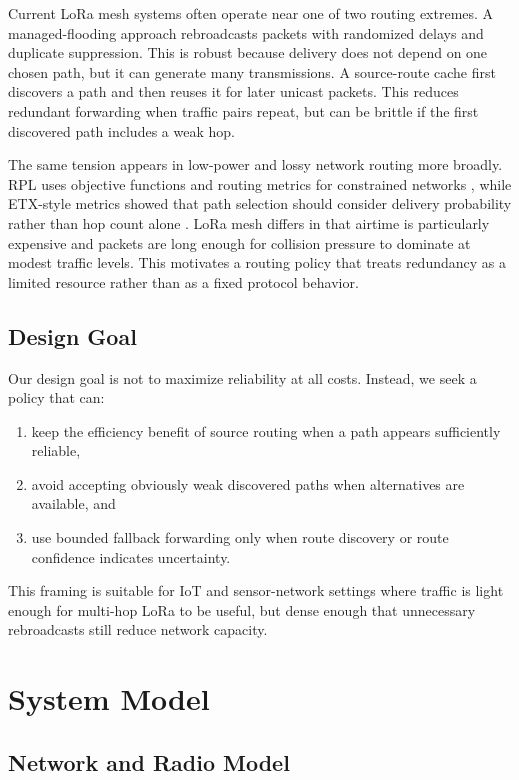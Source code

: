 \documentclass[conference]{IEEEtran}
\begin{document}
Current LoRa mesh systems often operate near one of two routing extremes. A
managed-flooding approach rebroadcasts packets with randomized delays and
duplicate suppression. This is robust because delivery does not depend on one
chosen path, but it can generate many transmissions. A source-route cache first
discovers a path and then reuses it for later unicast packets. This reduces
redundant forwarding when traffic pairs repeat, but can be brittle if the first
discovered path includes a weak hop.

The same tension appears in low-power and lossy network routing more broadly.
RPL uses objective functions and routing metrics for constrained networks
\cite{rfc6550}, while ETX-style metrics showed that path selection should
consider delivery probability rather than hop count alone \cite{decouto2003etx}.
LoRa mesh differs in that airtime is particularly expensive and packets are
long enough for collision pressure to dominate at modest traffic levels. This
motivates a routing policy that treats redundancy as a limited resource rather
than as a fixed protocol behavior.

\subsection{Design Goal}

Our design goal is not to maximize reliability at all costs. Instead, we seek a
policy that can:
\begin{enumerate}
    \item keep the efficiency benefit of source routing when a path appears
    sufficiently reliable,
    \item avoid accepting obviously weak discovered paths when alternatives are
    available, and
    \item use bounded fallback forwarding only when route discovery or route
    confidence indicates uncertainty.
\end{enumerate}

This framing is suitable for IoT and sensor-network settings where traffic is
light enough for multi-hop LoRa to be useful, but dense enough that unnecessary
rebroadcasts still reduce network capacity.

\section{System Model}

\subsection{Network and Radio Model}
\end{document}
